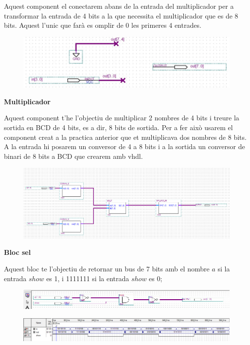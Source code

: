 \documentclass[12pt, a4papre]{article}
\begin{document}
	Aquest component el conectarem abans de la entrada del multiplicador per a transformar la entrada de 4 bits a la que necessita el multiplicador que es de 8 bits. Aquest l'unic que farà es omplir de 0 les primeres 4 entrades.
	\begin{figure}[H]
		\begin{center}
		\includegraphics[width=130mm]{Bin_4_8.jpeg}
		\end{center}
	\end{figure}
	
	\textbf{\large{Multiplicador}}
	
	Aquest component t'he l'objectiu de multiplicar 2 nombres de 4 bits i treure la sortida en BCD de 4 bits, es a dir, 8 bits de sortida. Per a fer això usarem el component creat a la practica anterior que et multiplicava dos nombres de 8 bits. A la entrada hi posarem un conversor de 4 a 8 bits i a la sortida un conversor de binari de 8 bits a BCD que crearem amb vhdl.
	
	\begin{figure}[H]
		\begin{center}
		\includegraphics[width=130mm]{Mult_Bin_BCD.jpeg}
		\end{center}
	\end{figure}
	
	\textbf{\large{Bloc sel}}
	
	Aquest bloc te l'objectiu de retornar un bus de 7 bits amb el nombre $a$ si la entrada $show$ es 1, i 1111111 si la entrada $show$ es 0;
	\begin{figure}[H]
		\begin{center}
		\includegraphics[width=130mm]{SEL.jpeg}
		\end{center}
	\end{figure}
	
	\begin{figure}[H]
		\begin{center}
		\includegraphics[width=130mm]{Simulacio_Sel.jpeg}
		\end{center}
	\end{figure}
		
\end{document}

